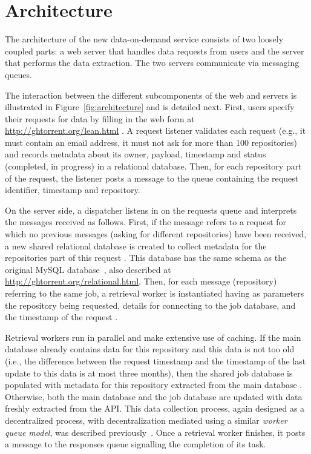 
\section{Architecture}
\label{sec:arch}

The architecture of the new \ght data-on-demand service consists of two loosely coupled parts:
a web server that handles data requests from users and the \ght server that performs the data extraction.
The two servers communicate via messaging queues.

The interaction between the different subcomponents of the web and \ght servers is illustrated in
Figure~\ref{fig:architecture} and is detailed next.
First, users specify their requests for data by filling in the web form at \url{http://ghtorrent.org/lean.html} .
A request listener validates each request (e.g., it must contain an email address, it must not ask for
more than 100 repositories)
and records metadata about its owner, payload, 
timestamp and status (completed, in progress) in
a relational database.
Then, for each \gh repository part of the request, the listener posts a message to the queue 
containing the request identifier, timestamp and repository.

On the \ght server side, a dispatcher listens in on the requests queue  and interprets the
messages received as follows.
First, if the message refers to a request for which no previous messages (asking for different repositories)
have been received, a new shared relational database is created to collect metadata for the repositories part
of this request .
This database has the same schema as the original \ght MySQL database~\cite{gousios2013ghtorent},
also described at \url{http://ghtorrent.org/relational.html}.
Then, for each message (repository) referring to the same job, a retrieval worker is instantiated having
as parameters the repository being requested, details for connecting to the job database, and the
timestamp of the request .

Retrieval workers run in parallel and make extensive use of caching.
If the main \ght database already contains data for this repository and this data is not too old
(i.e., the difference between the request timestamp and the timestamp of the last update to this data is at
most three months), then the shared job database is populated with metadata for this
repository extracted from the main \ght database . 
Otherwise, both the main \ght database and the job database  are updated with data freshly extracted
from the \gh API.
This data collection process, again designed as a decentralized process, with decentralization mediated
using a similar \emph{worker queue model}, was described previously~\cite{gousios2013ghtorent}.
Once a retrieval worker finishes, it posts a message to the responses queue  signalling
the completion of its task.

